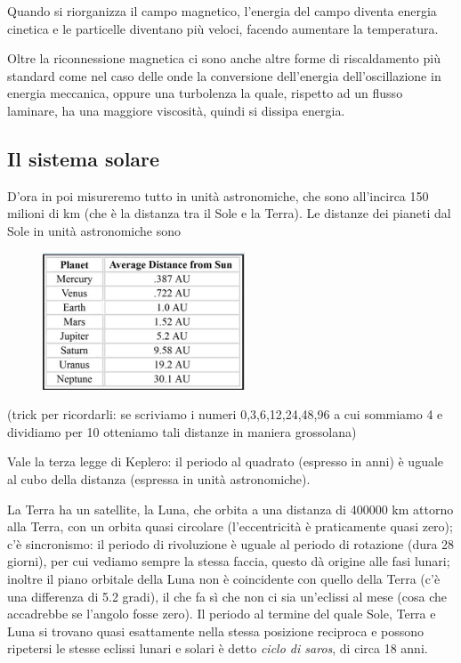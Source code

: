 Quando si riorganizza il campo magnetico, l'energia del campo diventa energia cinetica e le particelle diventano più veloci, facendo aumentare la temperatura.

Oltre la riconnessione magnetica ci sono anche altre forme di riscaldamento più standard come nel caso delle onde la conversione dell'energia dell'oscillazione in energia meccanica, oppure una turbolenza la quale, rispetto ad un flusso laminare, ha una maggiore viscosità, quindi si dissipa energia. 

\subsection{Il sistema solare}
D'ora in poi misureremo tutto in unità astronomiche, che sono all'incirca 150 milioni di km (che è la distanza tra il Sole e la Terra). Le distanze dei pianeti dal Sole in unità astronomiche sono

\begin{figure}[H]
    \centering
    \includegraphics[width=6cm]{Distanze.JPG}
\end{figure}

(trick per ricordarli: se scriviamo i numeri 0,3,6,12,24,48,96 a cui sommiamo 4 e dividiamo per 10 otteniamo tali distanze in maniera grossolana)

Vale la terza legge di Keplero: il periodo al quadrato (espresso in anni) è uguale al cubo della distanza (espressa in unità astronomiche).

La Terra ha un satellite, la Luna, che orbita a una distanza di 400000 km attorno alla Terra, con un orbita quasi circolare (l'eccentricità è praticamente quasi zero); c'è sincronismo: il periodo di rivoluzione è uguale al periodo di rotazione (dura 28 giorni), per cui vediamo sempre la stessa faccia, questo dà origine alle fasi lunari; inoltre il piano orbitale della Luna non è coincidente con quello della Terra (c'è una differenza di 5.2 gradi), il che fa sì che non ci sia un'eclissi al mese (cosa che accadrebbe se l'angolo fosse zero). Il periodo al termine del quale Sole, Terra e Luna si trovano quasi esattamente nella stessa posizione reciproca e possono ripetersi le stesse eclissi lunari e solari è detto \textit{ciclo di saros}, di circa 18 anni.

